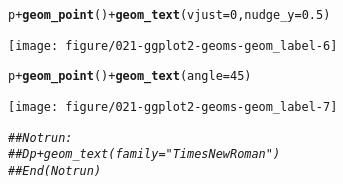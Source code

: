 \documentclass[a4paper,titlepage]{tufte-handout}\usepackage[]{graphicx}\usepackage[]{color}
\makeatletter
\def\maxwidth{ %
  \ifdim\Gin@nat@width>\linewidth
    \linewidth
  \else
    \Gin@nat@width
  \fi
}
\newcommand{\hlnum}[1]{\textcolor[rgb]{0.686,0.059,0.569}{#1}}%
\newcommand{\hlcom}[1]{\textcolor[rgb]{0.678,0.584,0.686}{\textit{#1}}}%
\newcommand{\hlopt}[1]{\textcolor[rgb]{0,0,0}{#1}}%
\newcommand{\hlstd}[1]{\textcolor[rgb]{0.345,0.345,0.345}{#1}}%
\newcommand{\hlkwc}[1]{\textcolor[rgb]{0.333,0.667,0.333}{#1}}%
\newcommand{\hlkwd}[1]{\textcolor[rgb]{0.737,0.353,0.396}{\textbf{#1}}}%
\newenvironment{kframe}{%
 \def\at@end@of@kframe{}%
 \ifinner\ifhmode%
  \def\at@end@of@kframe{\end{minipage}}%
  \begin{minipage}{\columnwidth}%
 \fi\fi%
 \def\FrameCommand##1{\hskip\@totalleftmargin \hskip-\fboxsep
 \colorbox{shadecolor}{##1}\hskip-\fboxsep
     \hskip-\linewidth \hskip-\@totalleftmargin \hskip\columnwidth}%
 \MakeFramed {\advance\hsize-\width
   \@totalleftmargin\z@ \linewidth\hsize
   \@setminipage}}%
 {\par\unskip\endMakeFramed%
 \at@end@of@kframe}
\newenvironment{knitrout}{}{} %
\makeatother
\begin{document}
\begin{knitrout}
\begin{kframe}
\begin{alltt}
\hlstd{p} \hlopt{+} \hlkwd{geom_point}\hlstd{()} \hlopt{+} \hlkwd{geom_text}\hlstd{(}\hlkwc{vjust} \hlstd{=} \hlnum{0}\hlstd{,} \hlkwc{nudge_y} \hlstd{=} \hlnum{0.5}\hlstd{)}
\end{alltt}
\end{kframe}
\texttt{[image: figure/021-ggplot2-geoms-geom\_label-6]} 
\begin{kframe}\begin{alltt}
\hlstd{p} \hlopt{+} \hlkwd{geom_point}\hlstd{()} \hlopt{+} \hlkwd{geom_text}\hlstd{(}\hlkwc{angle} \hlstd{=} \hlnum{45}\hlstd{)}
\end{alltt}
\end{kframe}
\texttt{[image: figure/021-ggplot2-geoms-geom\_label-7]} 
\begin{kframe}\begin{alltt}
\hlcom{## Not run: }
\hlcom{##D p + geom_text(family = "Times New Roman")}
\hlcom{## End(Not run)}


\end{alltt}
\end{kframe}
\end{knitrout}
\end{document}
